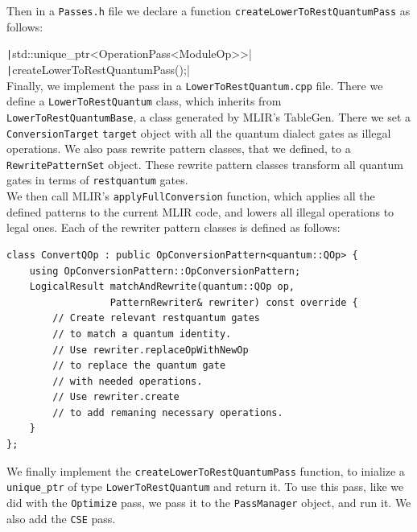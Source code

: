 Then in a \texttt{Passes.h} file we declare a function
\texttt{createLowerToRestQuantumPass} as follows:

\texttt|std::unique_ptr<OperationPass<ModuleOp>>|\\
\texttt|createLowerToRestQuantumPass();| \\Finally, we implement the pass in a
\texttt{LowerToRestQuantum.cpp} file. There we define a
\texttt{LowerToRestQuantum} class, which inherits from
\texttt{LowerToRestQuantumBase}, a class generated by MLIR's TableGen. There we
set a \texttt{ConversionTarget} \texttt{target} object with all the quantum
dialect gates as illegal operations. We also pass rewrite pattern classes, that
we defined, to  a \texttt{RewritePatternSet} object. These rewrite pattern
classes transform all quantum gates in terms of \texttt{restquantum} gates.\\
We then call MLIR's \texttt{applyFullConversion} function, which applies all the
defined patterns to the current MLIR code, and lowers all illegal operations to
legal ones. Each of the rewriter pattern classes is defined as follows:
\begin{verbatim}
class ConvertQOp : public OpConversionPattern<quantum::QOp> { 
    using OpConversionPattern::OpConversionPattern; 
    LogicalResult matchAndRewrite(quantum::QOp op, 
                  PatternRewriter& rewriter) const override { 
        // Create relevant restquantum gates 
        // to match a quantum identity.
        // Use rewriter.replaceOpWithNewOp 
        // to replace the quantum gate
        // with needed operations.
        // Use rewriter.create 
        // to add remaning necessary operations.
    } 
};
\end{verbatim}

We finally implement the \texttt{createLowerToRestQuantumPass} function,
to inialize a \texttt{unique\_ptr}  of type \texttt{LowerToRestQuantum} and return it.
To use this pass, like we did with the \texttt{Optimize} pass, we pass it
to the \texttt{PassManager} object, and run it. We also add the \texttt{CSE} pass.

